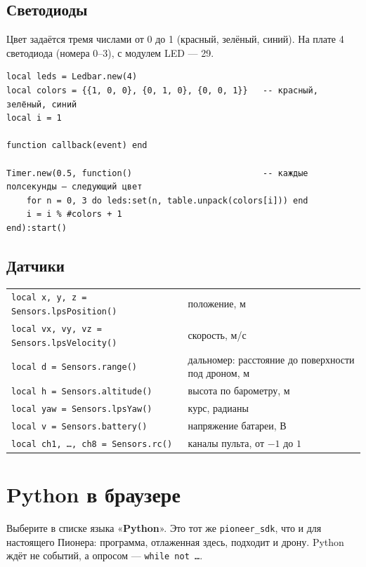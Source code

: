 \documentclass[11pt,a4paper]{article}
\newcommand{\ui}[1]{«\textbf{#1}»}
\begin{document}
\subsection{Светодиоды}
Цвет задаётся тремя числами от 0 до 1 (красный, зелёный, синий). На плате 4 светодиода (номера 0–3),
с модулем LED — 29.

\begin{lstlisting}[style=lua]
local leds = Ledbar.new(4)
local colors = {{1, 0, 0}, {0, 1, 0}, {0, 0, 1}}   -- красный, зелёный, синий
local i = 1

function callback(event) end

Timer.new(0.5, function()                          -- каждые полсекунды — следующий цвет
    for n = 0, 3 do leds:set(n, table.unpack(colors[i])) end
    i = i % #colors + 1
end):start()
\end{lstlisting}

\subsection{Датчики}
\begin{center}
\small
\begin{tabularx}{\linewidth}{@{}l X@{}}
\toprule
\texttt{local x, y, z = Sensors.lpsPosition()} & положение, м \\
\texttt{local vx, vy, vz = Sensors.lpsVelocity()} & скорость, м/с \\
\texttt{local d = Sensors.range()} & дальномер: расстояние до поверхности под дроном, м \\
\texttt{local h = Sensors.altitude()} & высота по барометру, м \\
\texttt{local yaw = Sensors.lpsYaw()} & курс, радианы \\
\texttt{local v = Sensors.battery()} & напряжение батареи, В \\
\texttt{local ch1, \dots, ch8 = Sensors.rc()} & каналы пульта, от $-1$ до $1$ \\
\bottomrule
\end{tabularx}
\end{center}

\section{Python в браузере}

Выберите в списке языка \ui{Python}. Это тот же \texttt{pioneer\_sdk}, что и для настоящего Пионера:
программа, отлаженная здесь, подходит и дрону. Python ждёт не событий, а опросом — \texttt{while not \dots}.
\end{document}
